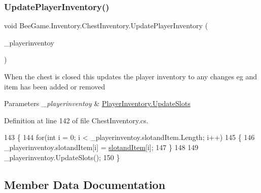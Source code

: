 \subsubsection{\texorpdfstring{Update\+Player\+Inventory()}{UpdatePlayerInventory()}}
{\footnotesize\ttfamily void Bee\+Game.\+Inventory.\+Chest\+Inventory.\+Update\+Player\+Inventory (\begin{DoxyParamCaption}\item[{\hyperlink{class_bee_game_1_1_inventory_1_1_player_inventory}{Player\+Inventory}}]{\+\_\+playerinventoy }\end{DoxyParamCaption})\hspace{0.3cm}{\ttfamily [private]}}



When the chest is closed this updates the player inventory to any changes eg and item has been added or removed 


\begin{DoxyParams}{Parameters}
{\em \+\_\+playerinventoy} & \hyperlink{class_bee_game_1_1_inventory_1_1_inventory_base_ac8edbffe8b164d66297c127654c844c4}{Player\+Inventory.\+Update\+Slots}\\
\hline
\end{DoxyParams}


Definition at line 142 of file Chest\+Inventory.\+cs.


\begin{DoxyCode}
143         \{
144             \textcolor{keywordflow}{for}(\textcolor{keywordtype}{int} i = 0; i < \_playerinventoy.slotandItem.Length; i++)
145             \{
146                 \_playerinventoy.slotandItem[i] = \hyperlink{class_bee_game_1_1_inventory_1_1_inventory_base_a405502a6eabf14e1498d96dc8aff5e8d}{slotandItem}[i];
147             \}
148 
149             \_playerinventoy.UpdateSlots();
150         \}
\end{DoxyCode}


\subsection{Member Data Documentation}
\mbox{\label{class_bee_game_1_1_inventory_1_1_chest_inventory_aa18498b9af704585d4c747ff5a7444f8}} 
